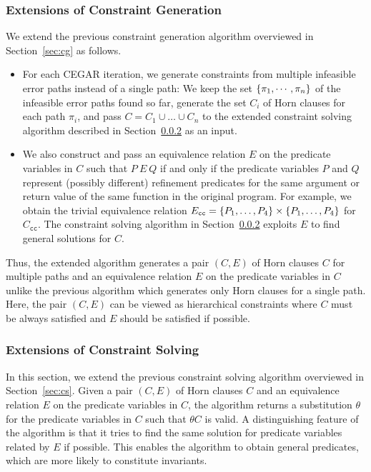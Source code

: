 \vspace{-2pt}
\subsubsection{Extensions of Constraint Generation}
\label{sec:extcg}

We extend the previous constraint generation algorithm overviewed in
Section~\ref{sec:cg} as follows.
\vspace{-4pt}
\begin{itemize}
\item For each CEGAR iteration, we generate constraints from multiple
infeasible error paths instead of a single path:  We keep the set
\(\{{\pi_1,\cdots,\pi_n}\}\) of the infeasible error paths found so far,
generate the set \(C_i\) of Horn clauses for each path \(\pi_i\), and
pass \(C=C_1 \cup \dots \cup C_n\) to the extended constraint solving
algorithm described in Section~\ref{sec:extcs} as an input.
\item We also construct and pass an equivalence relation \(E\) on the 
predicate variables in \(C\) such that \(P\ E\ Q\) if and only if the 
predicate variables \(P\) and \(Q\) represent (possibly different) 
refinement predicates for the same argument or return value of the same 
function in the original program.  For example, we obtain the trivial 
equivalence relation \(E_{\texttt{cc}}=\{{P_1,\dots,P_4}\} 
\times\{{P_1,\dots,P_4}\}\) for \(C_{\texttt{cc}}\).  The constraint 
solving algorithm in Section~\ref{sec:extcs} exploits \(E\) to find 
general solutions for \(C\).
\end{itemize}
\vspace{-4pt}
Thus, the extended algorithm generates a pair \((C,E)\) of Horn clauses 
\(C\) for multiple paths and an equivalence relation \(E\) on the 
predicate variables in \(C\) unlike the previous algorithm which 
generates only Horn clauses for a single path.  Here, the pair \((C,E)\) 
can be viewed as hierarchical constraints where \(C\) must be always 
satisfied and \(E\) should be satisfied if possible.

\vspace{-2pt}
\subsubsection{Extensions of Constraint Solving}
\label{sec:extcs}

In this section, we extend the previous constraint solving algorithm 
overviewed in Section~\ref{sec:cs}.  Given a pair \((C,E)\) of Horn 
clauses \(C\) and an equivalence relation \(E\) on the predicate 
variables in \(C\), the algorithm returns a substitution \(\theta\) for 
the predicate variables in \(C\) such that \(\theta C\) is valid.  A 
distinguishing feature of the algorithm is that it tries to find the 
same solution for predicate variables related by \(E\) if possible.  
This enables the algorithm to obtain general predicates, which are more 
likely to constitute invariants. %


